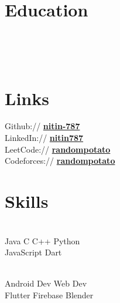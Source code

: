 \documentclass[]{deedy-resume-openfont}
\begin{document}

\begin{minipage}[t]{0.33\textwidth} 

\section{Education} 

\sectionsep

 \\
\sectionsep

 \\
\sectionsep

\section{Links} 
Github:// \href{https://github.com/nitin-787}{\bf nitin-787} \\
LinkedIn://  \href{https://www.linkedin.com/in/nitin787/}{\bf nitin787} \\
LeetCode://  \href{https://leetcode.com/u/random_potato/}{\bf randompotato} \\
Codeforces://  \href{https://codeforces.com/profile/random_potato}{\bf  randompotato}\\

\section{Skills}
 \\
\textbullet{} Java \textbullet{}   C \textbullet{} C++ \textbullet{} Python \\ \textbullet{} JavaScript \textbullet{} Dart  \\\sectionsep

 \\
\textbullet{} Android Dev \textbullet{} Web Dev \\ \textbullet{} Flutter \textbullet{} Firebase \textbullet{} Blender \\
\sectionsep


\end{minipage}
\end{document}
